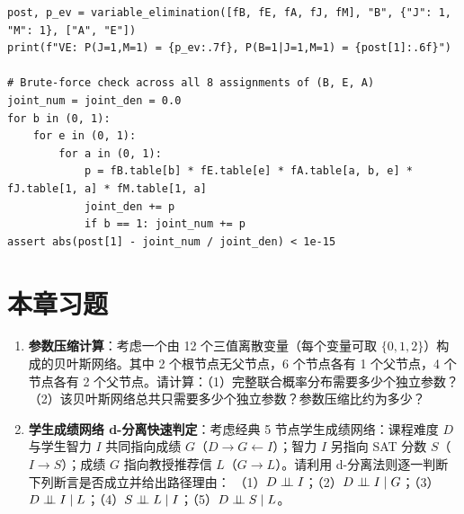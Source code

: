 \begin{lstlisting}[caption={通用离散贝叶斯网络变量消元（VE）引擎与暴力枚举精确核验},label={lst:ve}]
post, p_ev = variable_elimination([fB, fE, fA, fJ, fM], "B", {"J": 1, "M": 1}, ["A", "E"])
print(f"VE: P(J=1,M=1) = {p_ev:.7f}, P(B=1|J=1,M=1) = {post[1]:.6f}")

# Brute-force check across all 8 assignments of (B, E, A)
joint_num = joint_den = 0.0
for b in (0, 1):
    for e in (0, 1):
        for a in (0, 1):
            p = fB.table[b] * fE.table[e] * fA.table[a, b, e] * fJ.table[1, a] * fM.table[1, a]
            joint_den += p
            if b == 1: joint_num += p
assert abs(post[1] - joint_num / joint_den) < 1e-15
\end{lstlisting}

\section{本章习题}\label{sec:ch4-ex}


\begin{enumerate}[label=\textbf{4.\arabic*}]
  \item \textbf{参数压缩计算}：考虑一个由 12 个三值离散变量（每个变量可取 $\{0, 1, 2\}$）构成的贝叶斯网络。其中 2 个根节点无父节点，6 个节点各有 1 个父节点，4 个节点各有 2 个父节点。请计算：（1）完整联合概率分布需要多少个独立参数？（2）该贝叶斯网络总共只需要多少个独立参数？参数压缩比约为多少？

  \item \textbf{学生成绩网络 d-分离快速判定}：考虑经典 5 节点学生成绩网络：课程难度 $D$ 与学生智力 $I$ 共同指向成绩 $G$（$D \to G \leftarrow I$）；智力 $I$ 另指向 SAT 分数 $S$（$I \to S$）；成绩 $G$ 指向教授推荐信 $L$（$G \to L$）。请利用 d-分离法则逐一判断下列断言是否成立并给出路径理由：
  （1）$D \perp\!\!\!\perp I$；（2）$D \perp\!\!\!\perp I \mid G$；（3）$D \perp\!\!\!\perp I \mid L$；（4）$S \perp\!\!\!\perp L \mid I$；（5）$D \perp\!\!\!\perp S \mid L$。
\end{enumerate}


